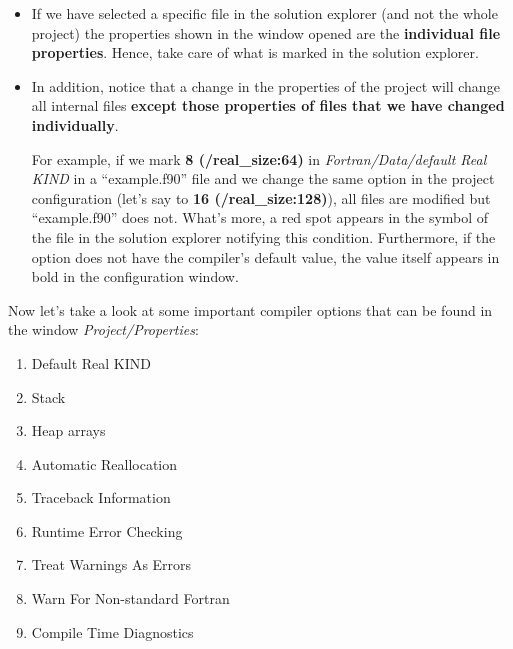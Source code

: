\begin{IN}
    \begin{itemize}  
        \item If we have selected a specific file in the solution explorer (and not the whole project) the properties shown in the window opened are the \textbf{individual file properties}. Hence, take care of what is marked in the solution explorer.
        
        \item In addition, notice that a change in the properties of the project will change all internal files \textbf{except those properties of files that we have changed individually}. 
        
        For example, if we mark \textbf{8 (/real\_size:64)} in \textit{Fortran/Data/default Real KIND} in a ``example.f90'' file and we change the same option in the project configuration (let's say to \textbf{16 (/real\_size:128)}), all files are modified but ``example.f90'' does not. What's more, a red spot appears in the symbol of the file in the solution explorer notifying this condition. Furthermore, if the option does not have the compiler's default value, the value itself appears in bold in the configuration window.
    \end{itemize}
\end{IN}

Now let's take a look at some important compiler options that can be found in the window \textit{Project/Properties}:

\begin{enumerate}[nosep]
    \item Default Real KIND
    \item Stack
    \item Heap arrays
    \item Automatic Reallocation
    \item Traceback Information
    \item Runtime Error Checking
    \item Treat Warnings As Errors
    \item Warn For Non-standard Fortran
    \item Compile Time Diagnostics
\end{enumerate}



